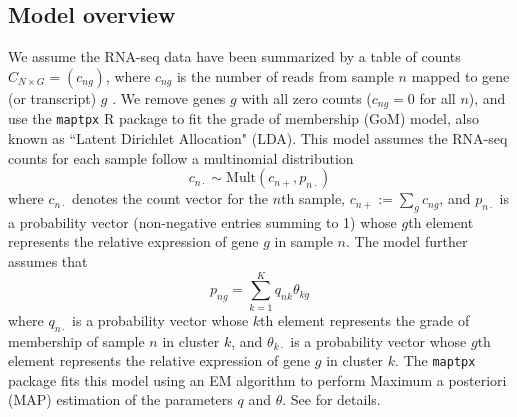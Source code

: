 \subsection{Model overview}

We assume the RNA-seq data have been summarized by a table of counts $C_{N \times G} = (c_{ng})$, where $c_{ng}$ is the number of reads from sample $n$ mapped to gene (or transcript) $g$ \cite{Oshlack2010}.  We remove genes $g$ with all zero counts ($c_{ng}=0$ for all $n$), and
use the {\tt maptpx} R package \cite{Taddy2012} to fit the grade of membership (GoM) model, also known as ``Latent Dirichlet Allocation" (LDA). 
This model assumes the RNA-seq counts for each sample follow a multinomial distribution
\begin{equation}
c_{n\cdot} \sim \text{Mult}(c_{n+}, p_{n\cdot})
\end{equation}
where $c_{n\cdot}$ denotes the count vector for the $n$th sample, $c_{n+} := \sum_g c_{ng}$, and $p_{n\cdot}$ is a probability vector (non-negative entries summing to 1) whose $g$th element represents the relative expression of gene $g$ in sample $n$. 
The model further assumes that 
\begin{equation}
p_{ng} = \sum_{k=1}^{K} q_{nk}\theta_{kg}    
\end{equation}
where $q_{n\cdot}$ is a probability vector whose $k$th element represents the grade of membership of
sample $n$ in cluster $k$, and $\theta_{k\cdot}$ is a probability vector whose $g$th element represents
the relative expression of gene $g$ in cluster $k$. The {\tt maptpx} package fits this model using an EM algorithm to perform Maximum a posteriori (MAP)  estimation of the parameters $q$ and $\theta$. See \cite{Taddy2012} for details.


%
%

